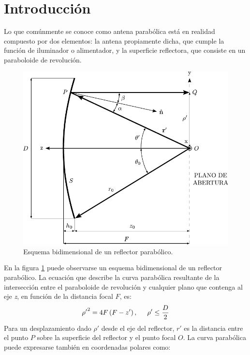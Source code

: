 
\section{Introducción}
\label{sec_principios_intro}

Lo que comúnmente se conoce como antena parabólica está en realidad compuesto por dos elementos: la antena propiamente dicha, que cumple la función de iluminador o alimentador, y la superficie reflectora, que consiste en un paraboloide de revolución.
\begin{figure}[H]
\centering
\includegraphics[scale = 0.97]{Figures/Principios/principios_1}
\caption{Esquema bidimensional de un reflector parabólico.}
\label{fig_principios:1}
\end{figure}
En la figura \ref{fig_principios:1} puede observarse un esquema bidimensional de un reflector parabólico. La ecuación que describe la curva parabólica resultante de la intersección entre el paraboloide de revolución y cualquier plano que contenga al eje \emph{z}, en función de la distancia focal $F$, es:
\begin{align}
{\rho '}^2 = 4F\left(F - z'\right),\hspace{5mm}\rho '\leq\frac{D}{2}
\label{ec_principios:1}
\end{align}
Para un desplazamiento dado $\rho '$ desde el eje del reflector, $r'$ es la distancia entre el punto $P$ sobre la superficie del reflector y el punto focal $O$. La curva parabólica puede expresarse también en coordenadas polares como:
